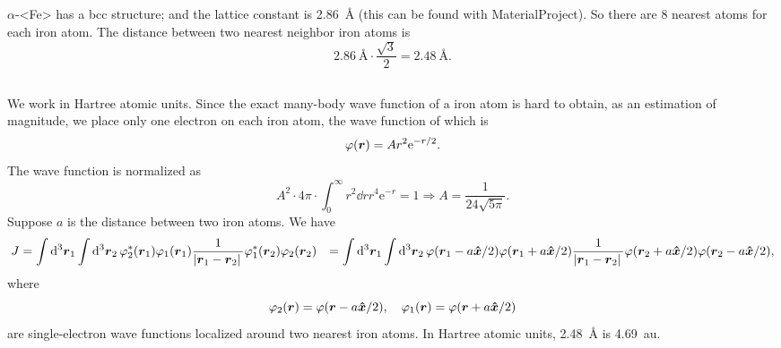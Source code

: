 \documentclass[hyperref, a4paper]{article}
\newcommand*{\ee}{\mathrm{e}}
\def\\{}%
\def\ce#1{<#1>}%
\begin{document}
\subsection{}

$\alpha$-\ce{Fe} has a bcc structure;
and the lattice constant is \SI{2.86}{\angstrom}
(this can be found with MaterialProject).
So there are 8 nearest atoms for each iron atom.
The distance between two nearest neighbor iron atoms is 
\[
    \SI{2.86}{\angstrom} \cdot \frac{\sqrt{3}}{2} = \SI{2.48}{\angstrom}.
\]

\subsection{}

We work in Hartree atomic units.
Since the exact many-body wave function of a iron atom is hard to obtain,
as an estimation of magnitude, 
we place only one electron on each iron atom,
the wave function of which is 
\begin{equation}
    \varphi(\vb*{r}) = A r^2 \ee^{-r/2}.
\end{equation}
The wave function is normalized as 
\begin{equation}
    A^2 \cdot 4 \pi \cdot \int_{0}^{\infty} r^2 \dd{r} r^4 \ee^{-r} = 1 \Rightarrow
    A = \frac{1}{24 \sqrt{5\pi}}.
\end{equation}
Suppose $a$ is the distance between two iron atoms.
We have 
\begin{equation}
    \begin{aligned}
        J &= \int \dd[3]{\vb*{r}_1} \int \dd[3]{\vb*{r}_2} 
        \varphi^*_2(\vb*{r}_1) \varphi_1(\vb*{r}_1) 
        \frac{1}{\abs*{\vb*{r}_1 - \vb*{r}_2}} 
        \varphi_1^*(\vb*{r}_2) \varphi_2(\vb*{r}_2) \\
        &= \int \dd[3]{\vb*{r}_1} \int \dd[3]{\vb*{r}_2} 
        \varphi(\vb*{r}_1 - a \vu*{x} / 2) \varphi(\vb*{r}_1 + a \vu*{x} / 2) 
        \frac{1}{\abs*{\vb*{r}_1 - \vb*{r}_2}} 
        \varphi(\vb*{r}_2 + a \vu*{x} / 2) \varphi(\vb*{r}_2 - a \vu*{x} / 2) ,
    \end{aligned}
\end{equation}
where 
\begin{equation}
    \varphi_2(\vb*{r}) = \varphi(\vb*{r} - a \vu*{x} / 2), \quad 
    \varphi_1(\vb*{r}) = \varphi(\vb*{r} + a \vu*{x} / 2)
\end{equation}
are single-electron wave functions localized around two nearest iron atoms.
In Hartree atomic units, \SI{2.48}{\angstrom} is \SI{4.69}{au}.
\end{document}
